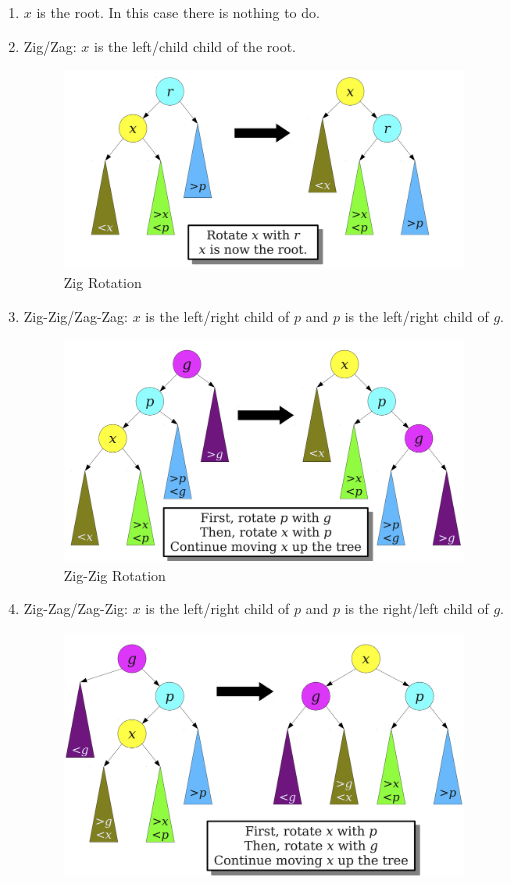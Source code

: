 \documentclass[12pt]{article}
\begin{document}
\begin{enumerate}
  \item $x$ is the root. In this case there is nothing to do.
  \item Zig/Zag: $x$ is the left/child child of the root.
    \begin{figure}[!ht]
      \centering
      \includegraphics[scale=0.16]{pics/splay_zig}
      \caption{Zig Rotation}
    \end{figure}
  \item Zig-Zig/Zag-Zag: $x$ is the left/right child of $p$ and $p$ is the left/right child of $g$. \\
    \begin{figure}[!ht]
      \centering
      \includegraphics[scale=0.16]{pics/splay_zig_zig}
      \caption{Zig-Zig Rotation}
    \end{figure}
  \item Zig-Zag/Zag-Zig: $x$ is the left/right child of $p$ and $p$ is the right/left child of $g$. \\
    \begin{figure}[!ht]
      \centering
      \includegraphics[scale=0.16]{pics/splay_zig_zag}

\end{figure}
\end{enumerate}
\end{document}
